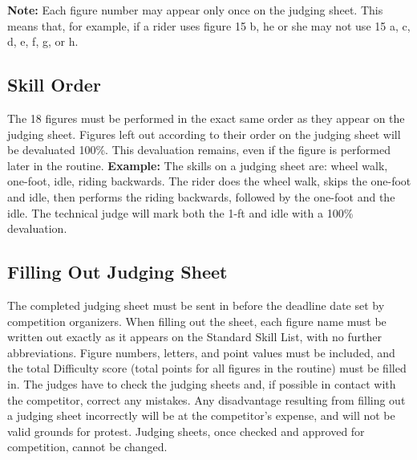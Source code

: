 \textbf{Note:} Each figure number may appear only once on the judging sheet.
This means that, for example, if a rider uses figure 15 b, he or she may not use 15 a, c, d, e, f, g, or h.

\subsection{Skill Order}
The 18 figures must be performed in the exact same order as they appear on the judging sheet.
Figures left out according to their order on the judging sheet will be devaluated 100\%.
This devaluation remains, even if the figure is performed later in the routine.
\textbf{Example:} The skills on a judging sheet are: wheel walk, one-foot, idle, riding backwards.
The rider does the wheel walk, skips the one-foot and idle, then performs the riding backwards, followed by the one-foot and the idle.
The technical judge will mark both the 1-ft and idle with a 100\% devaluation.

\subsection{Filling Out Judging Sheet}
The completed judging sheet must be sent in before the deadline date set by competition organizers.
When filling out the sheet, each figure name must be written out exactly as it appears on the Standard Skill List, with no further abbreviations.
Figure numbers, letters, and point values must be included, and the total Difficulty score (total points for all figures in the routine) must be filled in.
The judges have to check the judging sheets and, if possible in contact with the competitor, correct any mistakes.
Any disadvantage resulting from filling out a judging sheet incorrectly will be at the competitor's expense, and will not be valid grounds for protest.
Judging sheets, once checked and approved for competition, cannot be changed.

